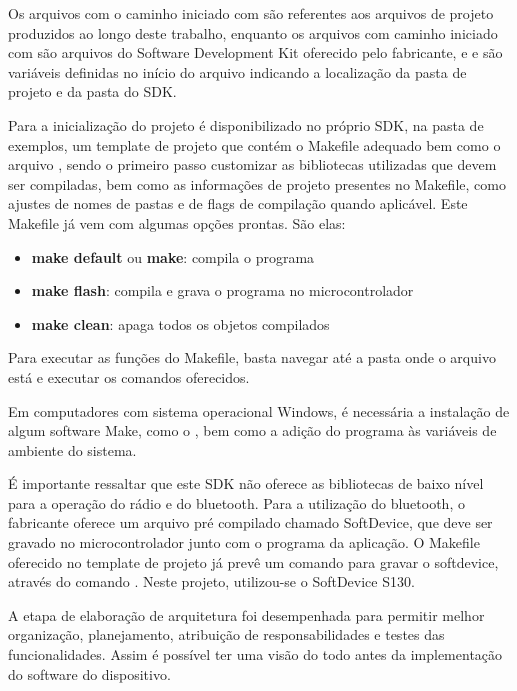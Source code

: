 Os arquivos com o caminho iniciado com  são referentes
aos arquivos de projeto produzidos ao longo deste trabalho, enquanto os arquivos
com caminho iniciado com  são arquivos do Software
Development Kit oferecido pelo fabricante, e  e
 são variáveis definidas no início do arquivo indicando a
localização da pasta de projeto e da pasta do SDK.

Para a inicialização do projeto é disponibilizado no próprio SDK, na pasta de
exemplos, um template de projeto que contém o Makefile adequado bem como o
arquivo , sendo o primeiro passo customizar as bibliotecas
utilizadas que devem ser compiladas, bem como as informações de projeto
presentes no Makefile, como ajustes de nomes de pastas e de flags de compilação
quando aplicável. Este Makefile já vem com algumas opções prontas. São elas:

\begin{itemize}
  \item \textbf{make default} ou \textbf{make}: compila o programa
  \item \textbf{make flash}: compila e grava o programa no microcontrolador
  \item \textbf{make clean}: apaga todos os objetos compilados
\end{itemize}

Para executar as funções do Makefile, basta navegar até a pasta onde o arquivo
está e executar os comandos oferecidos.

Em computadores com sistema operacional Windows, é necessária a instalação de
algum software Make, como o , bem como a adição
do programa às variáveis de ambiente do sistema.

É importante ressaltar que este SDK não oferece as bibliotecas de
baixo nível para a operação do rádio e do bluetooth. Para a utilização do bluetooth, o
fabricante oferece um arquivo pré compilado chamado SoftDevice, que deve ser
gravado no microcontrolador junto com o programa da aplicação. O Makefile
oferecido no template de projeto já prevê um comando para gravar o softdevice,
através do comando . Neste projeto,
utilizou-se o SoftDevice S130.



A etapa de elaboração de arquitetura foi desempenhada para permitir melhor
organização, planejamento, atribuição de responsabilidades e testes das
funcionalidades.
Assim é possível ter uma visão do todo antes da implementação do software do dispositivo.

